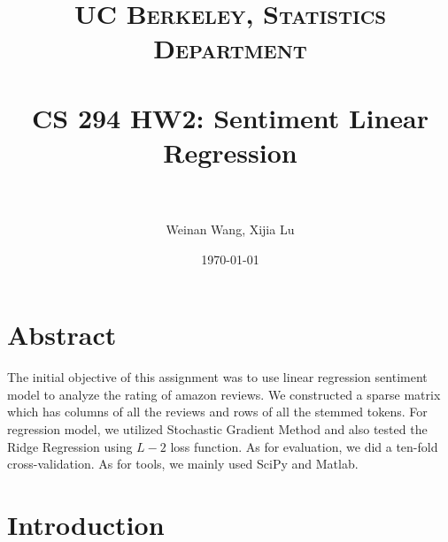 \documentclass[paper=a4, fontsize=11pt]{scrartcl} %
\title{	
\normalfont \normalsize 
\textsc{UC Berkeley, Statistics Department} \\ [25pt] %
\horrule{0.5pt} \\[0.4cm] %
\huge  CS 294 HW2: Sentiment Linear Regression\\ %
\horrule{2pt} \\[0.5cm] %
}
\author{Weinan Wang, Xijia Lu} %
\date{\normalsize\today} %
\numberwithin{equation}{section} %
\numberwithin{figure}{section} %
\numberwithin{table}{section} %
\begin{document}
\maketitle %
\def\wl{\par \vspace{\baselineskip}}

\section{Abstract}

The initial objective of this assignment was to use linear regression sentiment model to analyze the rating of amazon reviews. We constructed a sparse matrix which has columns of all the reviews and rows of all the stemmed tokens. For regression model, we utilized Stochastic Gradient Method and also tested the Ridge Regression using \(L-2\) loss function. As for evaluation, we did a ten-fold cross-validation. As for tools, we mainly used SciPy and Matlab.

\section{Introduction}
\end{document}
